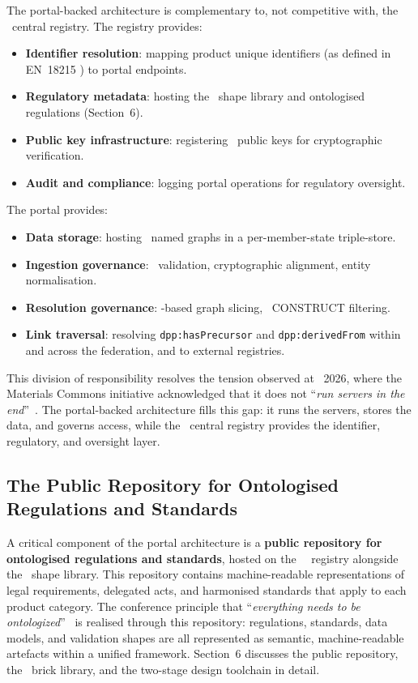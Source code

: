 The portal-backed architecture is complementary to, not competitive with, the
\EC\ central registry. The registry provides:

\begin{itemize}
\item \textbf{Identifier resolution}: mapping product unique identifiers (as
defined in EN~18215 \cite{en18215}) to portal endpoints.
\item \textbf{Regulatory metadata}: hosting the \SHACL\ shape library and
ontologised regulations (Section~6).
\item \textbf{Public key infrastructure}: registering \REO\ public keys for
cryptographic verification.
\item \textbf{Audit and compliance}: logging portal operations for regulatory
oversight.
\end{itemize}

The portal provides:

\begin{itemize}
\item \textbf{Data storage}: hosting \DPP\ named graphs in a per-member-state
triple-store.
\item \textbf{Ingestion governance}: \SHACL\ validation, cryptographic
alignment, entity normalisation.
\item \textbf{Resolution governance}: \ABAC-based graph slicing, \SPARQL\
CONSTRUCT filtering.
\item \textbf{Link traversal}: resolving \texttt{dpp:hasPrecursor} and
\texttt{dpp:derivedFrom} within and across the federation, and to external
registries.
\end{itemize}

This division of responsibility resolves the tension observed at \DPPforEU~2026,
where the Materials Commons initiative acknowledged that it does not
``\textit{run servers in the end}''~\cite{dpp4eu2026_day2}. The portal-backed
architecture fills this gap: it runs the servers, stores the data, and governs
access, while the \EC\ central registry provides the identifier, regulatory, and
oversight layer.

\subsection{The Public Repository for Ontologised Regulations and Standards}

A critical component of the portal architecture is a \textbf{public repository 
for ontologised regulations and standards}, hosted on the \EC\ \DPP\ registry 
alongside the \SHACL\ shape library. This repository contains machine-readable 
representations of legal requirements, delegated acts, and harmonised 
standards that apply to each product category. The conference principle that 
``\textit{everything needs to be ontologized}''~\cite{dpp4eu2026_day2} is 
realised through this repository: regulations, standards, data models, and 
validation shapes are all represented as semantic, machine-readable artefacts 
within a unified framework. Section~6 discusses the public repository, the 
\SHACL\ brick library, and the two-stage design toolchain in detail.


